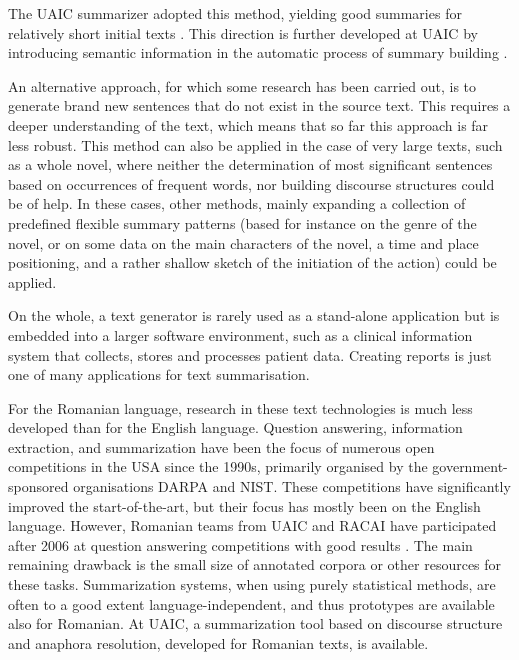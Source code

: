 \documentclass[]{../../metanetpaper}
\begin{document}
\begin{multicols}{2}
The UAIC summarizer adopted this method, yielding good summaries for relatively short initial texts \cite{cristea2}. This direction is further developed at UAIC by introducing semantic information in the automatic process of summary building \cite{trandabatRez}.

An alternative approach, for which some research has been carried out, is to generate brand new sentences that do not exist in the source text. This requires a deeper understanding of the text, which means that so far this approach is far less robust. This method can also be applied in the case of very large texts, such as a whole novel, where neither the determination of most significant sentences based on occurrences of frequent words, nor building discourse structures could be of help. In these cases, other methods, mainly expanding a collection of predefined flexible summary patterns (based for instance on the genre of the novel, or on some data on the main characters of the novel, a time and place positioning, and a rather shallow sketch of the initiation of the action) could be applied. 

On the whole, a text generator is rarely used as a stand-alone application but is embedded into a larger software environment, such as a clinical information system that collects, stores and processes patient data. Creating reports is just one of many applications for text summarisation. 


For the Romanian language, research in these text technologies is much less developed than for the English language. Question answering, information extraction, and summarization have been the focus of numerous open competitions in the USA since the 1990s, primarily organised by the government-sponsored organisations DARPA and NIST. These competitions have significantly improved the start-of-the-art, but their focus has mostly been on the English language. However, Romanian teams from UAIC and RACAI have participated after 2006 at question answering competitions with good results \cite{qa}. The main remaining drawback is the small size of annotated corpora or other resources for these tasks. Summarization systems, when using purely statistical methods, are often to a good extent language-independent, and thus prototypes are available also for Romanian. At UAIC, a summarization tool based on discourse structure and anaphora resolution, developed for Romanian texts, is available.


\end{multicols}
\end{document}
